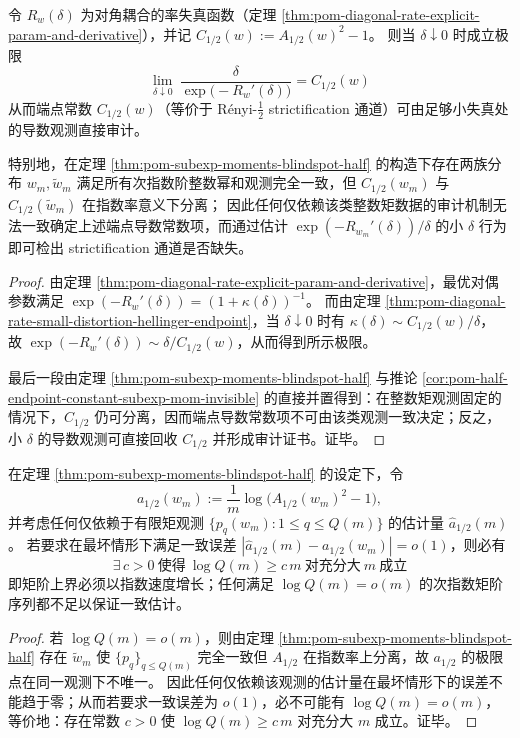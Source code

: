 \begin{proposition}\label{prop:pom-strictification-missing-auditable-by-rate-derivative}
令 \(R_w(\delta)\) 为对角耦合的率失真函数（定理 \ref{thm:pom-diagonal-rate-explicit-param-and-derivative}），并记
\(
C_{1/2}(w):=A_{1/2}(w)^2-1
\)。
则当 \(\delta\downarrow 0\) 时成立极限
\[
\boxed{\;
\lim_{\delta\downarrow 0}\ \frac{\delta}{\exp\bigl(-R_w'(\delta)\bigr)}=C_{1/2}(w)\;}
\]
从而端点常数 \(C_{1/2}(w)\)（等价于 Rényi-\(\tfrac12\) strictification 通道）可由足够小失真处的导数观测直接审计。
\par
特别地，在定理 \ref{thm:pom-subexp-moments-blindspot-half} 的构造下存在两族分布 \(w_m,\widetilde w_m\) 满足所有次指数阶整数幂和观测完全一致，但 \(C_{1/2}(w_m)\) 与 \(C_{1/2}(\widetilde w_m)\) 在指数率意义下分离；
因此任何仅依赖该类整数矩数据的审计机制无法一致确定上述端点导数常数项，而通过估计 \(\exp(-R_{w_m}'(\delta))/\delta\) 的小 \(\delta\) 行为即可检出 strictification 通道是否缺失。
\end{proposition}
\begin{proof}
由定理 \ref{thm:pom-diagonal-rate-explicit-param-and-derivative}，最优对偶参数满足
\(
\exp(-R_w'(\delta))=(1+\kappa(\delta))^{-1}
\)。
而由定理 \ref{thm:pom-diagonal-rate-small-distortion-hellinger-endpoint}，当 \(\delta\downarrow 0\) 时有
\(
\kappa(\delta)\sim C_{1/2}(w)/\delta
\)，
故
\(
\exp(-R_w'(\delta))\sim \delta/C_{1/2}(w)
\)，从而得到所示极限。
\par
最后一段由定理 \ref{thm:pom-subexp-moments-blindspot-half} 与推论 \ref{cor:pom-half-endpoint-constant-subexp-mom-invisible} 的直接并置得到：在整数矩观测固定的情况下，\(C_{1/2}\) 仍可分离，因而端点导数常数项不可由该类观测一致决定；反之，小 \(\delta\) 的导数观测可直接回收 \(C_{1/2}\) 并形成审计证书。证毕。
\end{proof}

\begin{proposition}\label{prop:pom-half-exponent-needs-exp-moment-order}
在定理 \ref{thm:pom-subexp-moments-blindspot-half} 的设定下，令
\[
a_{1/2}(w_m):=\frac{1}{m}\log\bigl(A_{1/2}(w_m)^2-1\bigr),
\]
并考虑任何仅依赖于有限矩观测 \(\{p_q(w_m):1\le q\le Q(m)\}\) 的估计量 \(\widehat a_{1/2}(m)\)。
若要求在最坏情形下满足一致误差 \(|\widehat a_{1/2}(m)-a_{1/2}(w_m)|=o(1)\)，则必有
\[
\boxed{\;\exists\,c>0\ \text{使得}\ \log Q(m)\ge c\,m\ \text{对充分大}\ m\ \text{成立}\;}
\]
即矩阶上界必须以指数速度增长；任何满足 \(\log Q(m)=o(m)\) 的次指数矩阶序列都不足以保证一致估计。
\end{proposition}
\begin{proof}
若 \(\log Q(m)=o(m)\)，则由定理 \ref{thm:pom-subexp-moments-blindspot-half} 存在 \(\widetilde w_m\) 使 \(\{p_q\}_{q\le Q(m)}\) 完全一致但 \(A_{1/2}\) 在指数率上分离，故 \(a_{1/2}\) 的极限点在同一观测下不唯一。
因此任何仅依赖该观测的估计量在最坏情形下的误差不能趋于零；从而若要求一致误差为 \(o(1)\)，必不可能有 \(\log Q(m)=o(m)\)，等价地：存在常数 \(c>0\) 使 \(\log Q(m)\ge c\,m\) 对充分大 \(m\) 成立。证毕。
\end{proof}

